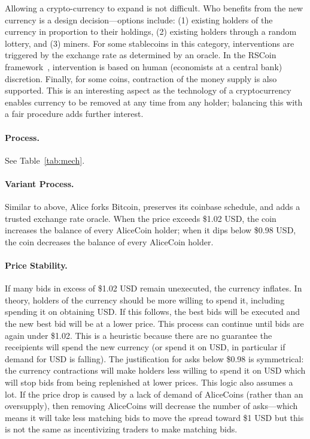 Allowing a crypto-currency to expand is not difficult. Who benefits from the new currency is a design decision---options include: (1) existing holders of the currency in proportion to their holdings, (2) existing holders through a random lottery, and (3) miners. For some stablecoins in this category, interventions are triggered by the exchange rate as determined by an oracle. In the RSCoin framework~\cite{danezis2015centrally}, intervention is based on human  (\ie economists at a central bank) discretion. Finally, for some coins, contraction of the money supply is also supported. This is an interesting aspect as the technology of a cryptocurrency enables currency to be removed at any time from any holder; balancing this with a fair procedure adds further interest.

\paragraph{Process.} See Table~\ref{tab:mech}.

\paragraph{Variant Process.} Similar to above, Alice forks Bitcoin, preserves its coinbase schedule, and adds a trusted exchange rate oracle. When the price exceeds \$1.02 USD, the coin increases the balance of every AliceCoin holder; when it dips below \$0.98 USD, the coin decreases the balance of every AliceCoin holder.

\paragraph{Price Stability.} If many bids in excess of \$1.02 USD remain unexecuted, the currency inflates. In theory, holders of the currency should be more willing to spend it, including spending it on obtaining USD. If this follows, the best bids will be executed and the new best bid will be at a lower price. This process can continue until bids are again under \$1.02. This is a heuristic because there are no guarantee the receipients will spend the new currency (or spend it on USD, in particular if demand for USD is falling). The justification for asks below \$0.98 is symmetrical: the currency contractions will make holders less willing to spend it on USD which will stop bids from being replenished at lower prices. This logic also assumes a lot. If the price drop is caused by a lack of demand of AliceCoins (rather than an oversupply), then removing AliceCoins will decrease the number of asks---which means it will take less matching bids to move the spread toward \$1 USD but this is not the same as incentivizing traders to make matching bids. 

